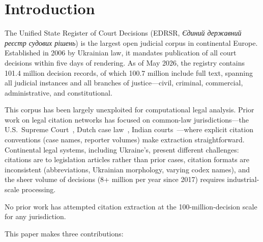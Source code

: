 \documentclass[11pt]{article}
\begin{document}
\section{Introduction}
\label{sec:intro}

The Unified State Register of Court Decisions (EDRSR, \emph{Єдиний державний реєстр судових рішень}) is the largest open judicial corpus in continental Europe.
Established in 2006 by Ukrainian law, it mandates publication of all court decisions within five days of rendering.
As of May 2026, the registry contains 101.4 million decision records, of which 100.7 million include full text, spanning all judicial instances and all branches of justice---civil, criminal, commercial, administrative, and constitutional.

This corpus has been largely unexploited for computational legal analysis.
Prior work on legal citation networks has focused on common-law jurisdictions---the U.S.\ Supreme Court~\citep{fowler2007network}, Dutch case law~\citep{winkels2012determining}, Indian courts~\citep{kumar2022citationnet}---where explicit citation conventions (case names, reporter volumes) make extraction straightforward.
Continental legal systems, including Ukraine's, present different challenges: citations are to legislation articles rather than prior cases, citation formats are inconsistent (abbreviations, Ukrainian morphology, varying codex names), and the sheer volume of decisions (8+ million per year since 2017) requires industrial-scale processing.

No prior work has attempted citation extraction at the 100-million-decision scale for any jurisdiction.

This paper makes three contributions:
\end{document}
